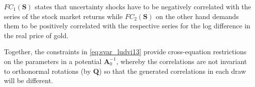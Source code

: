 \documentclass[a4paper,11pt,listof=nochaptergap,oneside,pointednumbers,bibtotoc,bigheadings,liststotoc,hidelinks]{scrbook}
\theoremstyle{mysatz}
\theoremstyle{mydefinition}
\theoremstyle{mytheorem}
\theoremstyle{mybemerkung}
\newcommand{\vect}[1]{\boldsymbol{\mathbf{#1}}}
\begin{document}
$FC_1(\vect{S})$ states that uncertainty shocks have to be negatively correlated with the series of the stock market returns while $FC_2(\vect{S})$ on the other hand demands them to be positively correlated with the respective series for the log difference in the real price of gold.

Together, the constraints in \ref{eq:svar_ludvi13} provide cross-equation restrictions on the parameters in a potential $\vect{A}_0^{-1}$, whereby the correlations are not invariant to orthonormal rotations (by $\vect{Q}$) so that the generated correlations in each draw will be different. 
\end{document}
